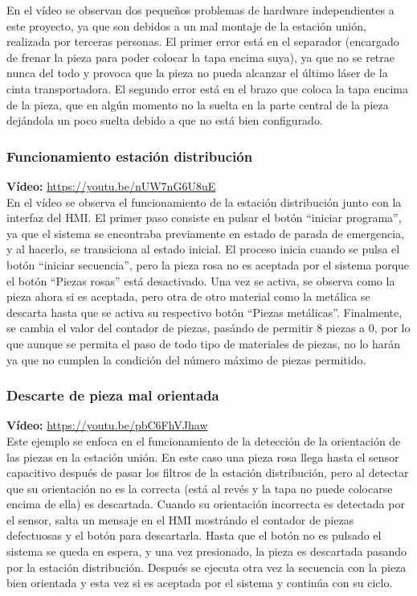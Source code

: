 En el vídeo se observan dos pequeños problemas de hardware independientes a este proyecto, ya que son debidos a un mal montaje de la estación unión, realizada por terceras personas. El primer error está en el separador (encargado de frenar la pieza para poder colocar la tapa encima suya), ya que no se retrae nunca del todo y provoca que la pieza no pueda alcanzar el último láser de la cinta transportadora. El segundo error está en el brazo que coloca la tapa encima de la pieza, que en algún momento no la suelta en la parte central de la pieza dejándola un poco suelta debido a que no está bien configurado. 

\clearpage



\subsubsection{Funcionamiento estación distribución}

\textbf{Vídeo:} \url{https://youtu.be/nUW7nG6U8uE} \\

En el vídeo se observa el funcionamiento de la estación distribución junto con la interfaz del HMI. El primer paso consiste en pulsar el botón “iniciar programa”, ya que el sistema se encontraba previamente en estado de parada de emergencia, y al hacerlo, se transiciona al estado inicial. El proceso inicia cuando se pulsa el botón ``iniciar secuencia'', pero la pieza rosa no es aceptada por el sistema porque el botón ``Piezas rosas'' está desactivado. Una vez se activa, se observa como la pieza ahora si es aceptada, pero otra de otro material como la metálica se descarta hasta que se activa su respectivo botón ``Piezas metálicas''. Finalmente, se cambia el valor del contador de piezas, pasándo de permitir 8 piezas a 0, por lo que aunque se permita el paso de todo tipo de materiales de piezas, no lo harán ya que no cumplen la condición del número máximo de piezas permitido. \\

\subsubsection{Descarte de pieza mal orientada}

\textbf{Vídeo:} \url{https://youtu.be/pbC6FhVJhaw} \\

Este ejemplo se enfoca en el funcionamiento de la detección de la orientación de las piezas en la estación unión. En este caso una pieza rosa llega hasta el sensor capacitivo después de pasar los filtros de la estación distribución, pero al detectar que su orientación no es la correcta (está al revés y la tapa no puede colocarse encima de ella) es descartada. Cuando su orientación incorrecta es detectada por el sensor, salta un mensaje en el HMI mostrándo el contador de piezas defectuosas y el botón para descartarla. Hasta que el botón no es pulsado el sistema se queda en espera, y una vez presionado, la pieza es descartada pasando por la estación distribución. Después se ejecuta otra vez la secuencia con la pieza bien orientada y esta vez si es aceptada por el sistema y continúa con su ciclo. 

